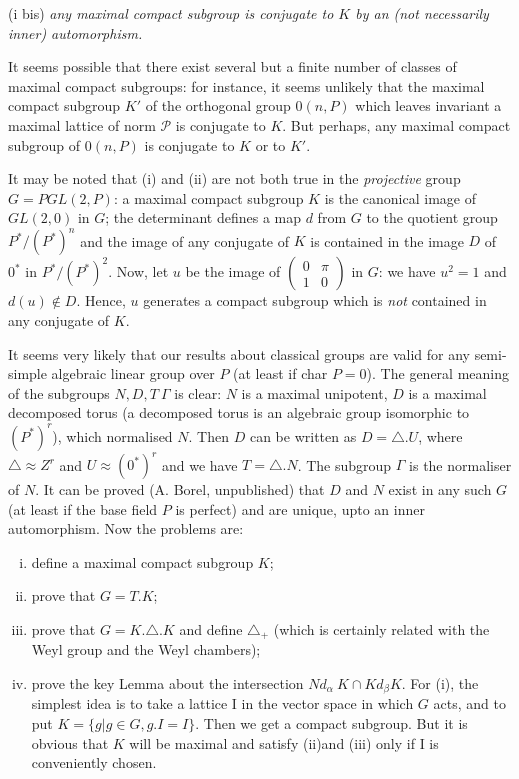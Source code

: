   (i bis) \textit{any maximal compact subgroup is conjugate to $K$ by
    an (not necessarily inner) automorphism.} 
  
  It seems possible that there exist several but a finite number of
  class\-es of maximal compact subgroups: for instance, it seems
  unlikely that the maximal compact subgroup $K'$ of the orthogonal
  group $0(n,P)$ which leaves invariant a maximal lattice of norm
  $\mathscr{P}$ is conjugate to $K$. But perhaps, any maximal compact
  subgroup of $0(n,P)$ is conjugate to $K$ or to $K'$. 

  It may be noted that (i) and (ii) are not both true in the
  \textit{projective} group\pageoriginale $G = PGL(2,P)$: a maximal compact subgroup
  $K$ is the canonical image of $GL(2,0)$ in $G$; the determinant
  defines a map $d$ from $G$ to the quotient group $P^*/(P^*)^n$ and
  the image of any conjugate of $K$ is contained in the image $D$ of
  $0^*$ in $P^*/(P^*)^2$. Now, let $u$ be the image of
  $\begin{pmatrix}0 & \pi\\ 1 & 0 \end{pmatrix}$ in $G$: we have $u^2
  = 1$ and $d(u)\notin D$. Hence, $u$ generates a compact subgroup which
  is \textit{not} contained in any conjugate of $K$. 


It seems very likely that our results about classical groups are
  valid for any semi-simple algebraic linear group over $P$ (at least
  if char $P = 0$). The general meaning of the subgroups $N,D,T~
  \Gamma$ is clear: $N$ is a maximal unipotent, $D$ is a maximal
  decomposed torus (a decomposed torus is an algebraic group
  isomorphic to $(P^*)^r$), which normalised $N$. Then $D$ can be
  written as $D = \triangle.U$, where $\triangle\approx Z^r$ and
  $U\approx (0^*)^r$ and we have $T=\triangle.N$. The subgroup
  $\Gamma$ is the normaliser of $N$. It can be proved
  (A. Borel, unpublished) that $D$ and $N$ exist in any such $G$ (at
  least if the base field $P$ is perfect) and are unique, upto an
  inner automorphism. Now the problems are: 
  \begin{enumerate}[(i)]
  \item define a maximal compact subgroup $K$;
  \item prove that $G = T.K$;
  \item prove that $G = K.\triangle.K$ and define $\triangle_+$ (which
    is certainly related with the Weyl group and the Weyl chambers); 
  \item prove the key Lemma about the intersection $Nd_\alpha~K \cap
    Kd_{\beta} K$. For (i), the simplest idea is to take a lattice I
    in the vector space in which $G$ acts, and to put $K = \{ g|g \in
    G,g.I = I\}$. Then we get a compact subgroup. But it is obvious
    that $K$ will be maximal and satisfy (ii)\pageoriginale and (iii)
    only if I is conveniently chosen. 
\end{enumerate}

